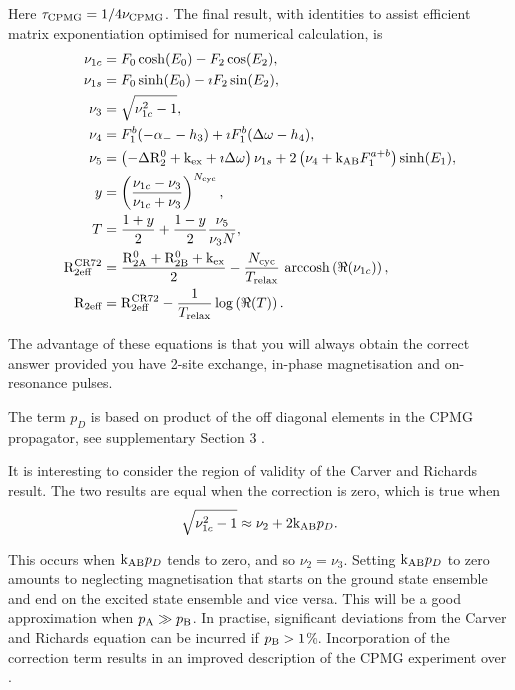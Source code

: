 Here $\tau_{\textrm{CPMG}} = 1 / 4\nu_{\textrm{CPMG}}$.
The final result, with identities to assist efficient matrix exponentiation optimised for numerical calculation, is
\begin{subequations}
\begin{align}
	\nu_{1c} & = F_0  \cosh(E_0) - F_2 \cos(E_2) , \\
	\nu_{1s} & = F_0  \sinh(E_0) - \imath F_2 \sin(E_2), \\
	\nu_3 & = \sqrt{\nu_{1c}^2 - 1} , \\
	\nu_4 & = F_1^b (-\alpha_- - h_3) + \imath F_1^b (\Delta\omega - h_4) , \\
	\nu_5 & = \left(-\Delta \mathrm{R}_2^0 + \textrm{k}_{\textrm{ex}} + \imath \Delta\omega\right) \nu_{1s} + 2 \left(\nu_4 + \textrm{k}_{\textrm{AB}} F_1^{a+b}\right) \sinh(E_1) , \\
    y & = \left( \frac{\nu_{1c} - \nu_3}{\nu_{1c} + \nu_3} \right) ^{N_{\textrm{cyc}}} , \\
	T & = \frac{1 + y}{2} + \frac{1 - y}{2} \frac{\nu_5}{\nu_3 N} , \\
	\mathrm{R}_{\textrm{2eff}}^{\textrm{CR72}} & = \frac{\mathrm{R}_{\mathrm{2A}}^0 + \mathrm{R}_{\mathrm{2B}}^0 + \textrm{k}_{\textrm{ex}}}{2} - \frac{N_{\textrm{cyc}}}{T_{\textrm{relax}}} \, \operatorname{arccosh}\left(\Re(\nu_{1c})\right) , \\
	\mathrm{R}_{\textrm{2eff}} & = \mathrm{R}_{\textrm{2eff}}^{\textrm{CR72}} - \frac{1}{T_{\textrm{relax}}} \log\left(\Re(T)\right) .
\end{align}
\end{subequations}

The advantage of these equations is that you will always obtain the correct answer provided you have 2-site exchange, in-phase magnetisation and on-resonance pulses.

The term $p_D$ is based on product of the off diagonal elements in the CPMG propagator, see supplementary Section 3 \citep{Baldwin2014}.

It is interesting to consider the region of validity of the Carver and Richards result.
The two results are equal when the correction is zero, which is true when
\begin{equation}
    \sqrt{\nu_{1c}^2-1} \approx \nu_2 + 2 \textrm{k}_{\textrm{AB}} p_D .
\end{equation}

This occurs when $\textrm{k}_{\textrm{AB}} p_D$ tends to zero, and so $\nu_2 = \nu_3$.
Setting $\textrm{k}_{\textrm{AB}} p_D$ to zero amounts to neglecting magnetisation that starts on the ground state ensemble and end on the excited state ensemble and vice versa.
This will be a good approximation when $p_{\textrm{A}} \gg p_{\textrm{B}}$.
In practise, significant deviations from the Carver and Richards equation can be incurred if $p_{\textrm{B}} > 1$\%.
Incorporation of the correction term results in an improved description of the CPMG experiment over \citet{CarverRichards72}.

